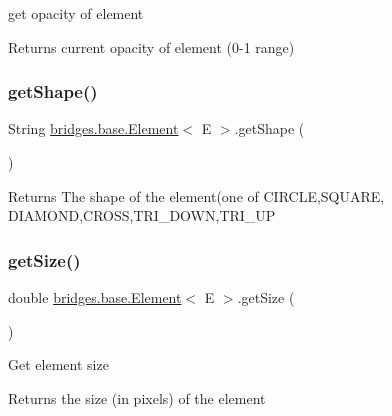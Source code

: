 get opacity of element

\begin{DoxyReturn}{Returns}
current opacity of element (0-\/1 range) 
\end{DoxyReturn}
\mbox{\label{classbridges_1_1base_1_1_element_aa0fe02d2f5491cf21cc6741f592536a8}} 
\subsubsection{\texorpdfstring{get\+Shape()}{getShape()}}
{\footnotesize\ttfamily String \hyperlink{classbridges_1_1base_1_1_element}{bridges.\+base.\+Element}$<$ E $>$.get\+Shape (\begin{DoxyParamCaption}{ }\end{DoxyParamCaption})}

\begin{DoxyReturn}{Returns}
The shape of the element(one of C\+I\+R\+C\+LE,S\+Q\+U\+A\+RE, D\+I\+A\+M\+O\+ND,C\+R\+O\+SS,T\+R\+I\+\_\+\+D\+O\+WN,T\+R\+I\+\_\+\+UP 
\end{DoxyReturn}
\mbox{\label{classbridges_1_1base_1_1_element_add4b836e041e45e0c7a80eb7fd5a229d}} 
\subsubsection{\texorpdfstring{get\+Size()}{getSize()}}
{\footnotesize\ttfamily double \hyperlink{classbridges_1_1base_1_1_element}{bridges.\+base.\+Element}$<$ E $>$.get\+Size (\begin{DoxyParamCaption}{ }\end{DoxyParamCaption})}

Get element size \begin{DoxyReturn}{Returns}
the size (in pixels) of the element 
\end{DoxyReturn}
\mbox{\label{classbridges_1_1base_1_1_element_a44ddc61db34b6cf0bab7dfba667d54af}} 
